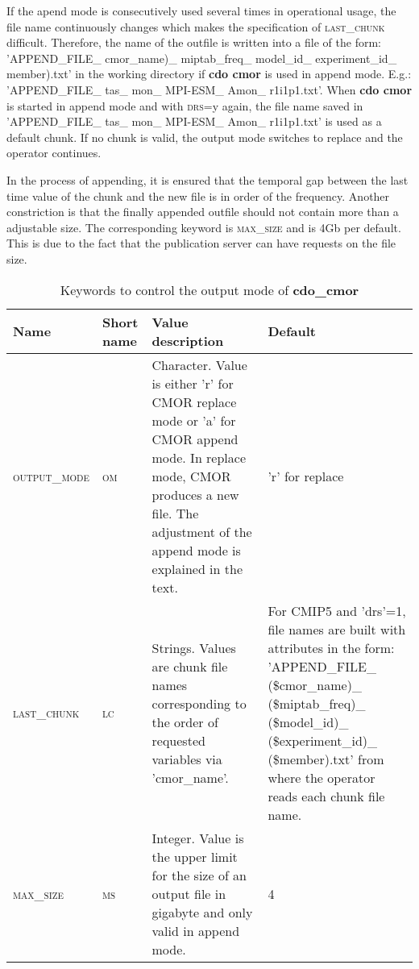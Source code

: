 If the apend mode is consecutively used several times in operational usage, the file name continuously changes which makes the specification of \textsc{last\_chunk} difficult. Therefore, the name of the outfile is written into a file of the form: 'APPEND\_FILE\_
cmor\_name)\_
miptab\_freq\_
model\_id\_
experiment\_id\_
member).txt' in the working directory if \textbf{cdo cmor} is used in append mode.
E.g.: 'APPEND\_FILE\_
tas\_
mon\_
MPI-ESM\_
Amon\_
r1i1p1.txt'. When \textbf{cdo cmor} is started in append mode and with \textsc{drs}=y again, the file name saved in 'APPEND\_FILE\_
tas\_
mon\_
MPI-ESM\_
Amon\_
r1i1p1.txt' is used as a default chunk. If no chunk is valid, the output mode switches to replace and the operator continues.

In the process of appending, it is ensured that the temporal gap between the last time value of the chunk and the new file is in order of the frequency. Another constriction is that the finally appended outfile should not contain more than a adjustable size. The corresponding keyword is \textsc{max\_size} and is 4Gb per default. This is due to the fact that the publication server can have requests on the file size.

\begin{table}[H]

\caption{Keywords to control the output mode of \textbf{cdo\_cmor}}
\label{table:KeysOperational}

\begin{tabular}[H]{|l|p{1cm}|p{6cm} | p{5.5cm} | }
\hline 
\textbf{Name} & \textbf{Short name} & \textbf{Value description} & \textbf{Default} \\ 
\hline 
\textsc{output\_mode} & \textsc{om} & Character. Value is either 'r' for CMOR replace mode or 'a' for CMOR append mode. In replace mode, CMOR produces a new file. The adjustment of the append mode is explained in the text. & 'r' for replace \\ 
\hline 
\textsc{last\_chunk} & \textsc{lc} & Strings. Values are chunk file names corresponding to the order of requested variables via 'cmor\_name'. & For CMIP5 and 'drs'=1, file names are built with attributes in the form: 'APPEND\_FILE\_
(\$cmor\_name)\_
(\$miptab\_freq)\_
(\$model\_id)\_
(\$experiment\_id)\_
(\$member).txt' from where the operator reads each chunk file name.  \\  
\hline 
\textsc{max\_size} & \textsc{ms} & Integer. Value is the upper limit for the size of an output file in gigabyte and only valid in append mode. & 4 \\  
\hline 
\end{tabular} 
\end{table}

